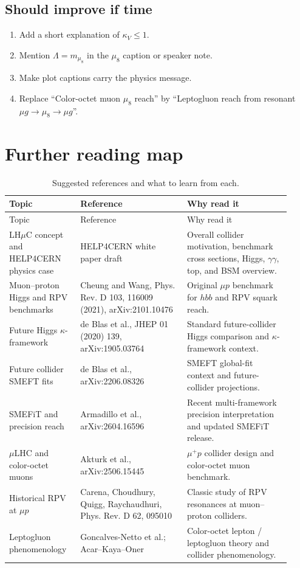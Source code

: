 \documentclass[11pt,a4paper]{article}
\newcommand{\LHmuC}{LH\ensuremath{\mu}C}
\begin{document}
\subsection*{Should improve if time}
\begin{enumerate}[leftmargin=*]
  \item Add a short explanation of \(\kappa_V\le1\).
  \item Mention \(\Lambda=m_{\mu_8}\) in the \(\mu_8\) caption or speaker note.
  \item Make plot captions carry the physics message.
  \item Replace ``Color-octet muon \(\mu_8\) reach'' by
  ``Leptogluon reach from resonant \(\mu g\to\mu_8\to\mu g\)''.
\end{enumerate}

\section{Further reading map}

\begin{longtable}{@{}p{0.23\linewidth}p{0.35\linewidth}p{0.34\linewidth}@{}}
\caption{Suggested references and what to learn from each.}\\
\toprule
Topic & Reference & Why read it \\
\midrule
\endfirsthead
\toprule
Topic & Reference & Why read it \\
\midrule
\endhead
\LHmuC{} concept and HELP4CERN physics case &
HELP4CERN white paper draft &
Overall collider motivation, benchmark cross sections, Higgs, \(\gamma\gamma\), top, and BSM overview. \\
Muon--proton Higgs and RPV benchmarks &
Cheung and Wang, Phys. Rev. D 103, 116009 (2021), arXiv:2101.10476 &
Original \(\mu p\) benchmark for \(hbb\) and RPV squark reach. \\
Future Higgs \(\kappa\)-framework &
de Blas et al., JHEP 01 (2020) 139, arXiv:1905.03764 &
Standard future-collider Higgs comparison and \(\kappa\)-framework context. \\
Future collider SMEFT fits &
de Blas et al., arXiv:2206.08326 &
SMEFT global-fit context and future-collider projections. \\
SMEFiT and precision reach &
Armadillo et al., arXiv:2604.16596 &
Recent multi-framework precision interpretation and updated SMEFiT release. \\
\(\mu\)LHC and color-octet muons &
Akturk et al., arXiv:2506.15445 &
\(\mu^+p\) collider design and color-octet muon benchmark. \\
Historical RPV at \(\mu p\) &
Carena, Choudhury, Quigg, Raychaudhuri, Phys. Rev. D 62, 095010 &
Classic study of RPV resonances at muon--proton colliders. \\
Leptogluon phenomenology &
Goncalves-Netto et al.; Acar--Kaya--Oner &
Color-octet lepton / leptogluon theory and collider phenomenology. \\
\bottomrule
\end{longtable}
\end{document}
